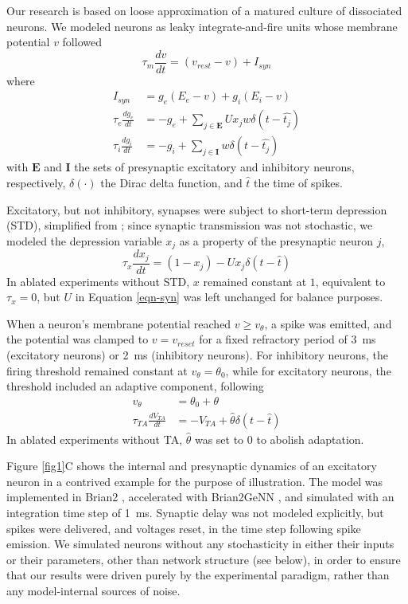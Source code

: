 \documentclass[pdflatex,iicol,sn-basic]{sn-jnl}
\theoremstyle{thmstyleone}%
\theoremstyle{thmstyletwo}%
\theoremstyle{thmstylethree}%
\begin{document}
Our research is based on loose approximation of a matured culture of dissociated neurons. We modeled neurons as leaky integrate-and-fire units whose membrane potential $v$ followed
\begin{equation}
    \tau_m \frac{dv}{dt} = (v_{rest}-v) + I_{syn}
\end{equation}
where
\begin{align}
    I_{syn} &= g_e(E_e-v) + g_i(E_i-v) \nonumber \\
    \tau_e \frac{dg_e}{dt} &= -g_e + \sum_{j \in \boldsymbol E} U x_j w \delta(t - \hat{t_j}) \nonumber \\
    \tau_i \frac{dg_i}{dt} &= -g_i + \sum_{j \in \boldsymbol I} w \delta(t - \hat{t_j}) \label{eqn-syn}
\end{align}
with $\boldsymbol E$ and $\boldsymbol I$ the sets of presynaptic excitatory and inhibitory neurons, respectively, $\delta(\cdot)$ the Dirac delta function, and $\hat{t}$ the time of spikes.

Excitatory, but not inhibitory, synapses were subject to short-term depression (STD), simplified from \cite{Tsodyks1997-qt}; since synaptic transmission was not stochastic, we modeled the depression variable $x_j$ as a property of the presynaptic neuron $j$,
\begin{equation}
    \tau_x \frac{dx_j}{dt} = (1-x_j) - U x_j \delta(t - \hat{t})
\end{equation}
In ablated experiments without STD, $x$ remained constant at $1$, equivalent to $\tau_x = 0$, but $U$ in Equation \ref{eqn-syn} was left unchanged for balance purposes.

When a neuron's membrane potential reached $v \geq v_\theta$, a spike was emitted, and the potential was clamped to $v = v_{reset}$ for a fixed refractory period of 3~ms (excitatory neurons) or 2~ms (inhibitory neurons). For inhibitory neurons, the firing threshold remained constant at $v_\theta = \theta_0$, while for excitatory neurons, the threshold included an adaptive component, following
\begin{align}
    v_\theta &= \theta_0 + \theta \nonumber \\
    \tau_{TA} \frac{dV_{TA}}{dt} &= -V_{TA} + \hat{\theta} \delta(t - \hat{t})
\end{align}
In ablated experiments without TA, $\hat{\theta}$ was set to $0$ to abolish adaptation.

Figure \ref{fig1}C shows the internal and presynaptic dynamics of an excitatory neuron in a contrived example for the purpose of illustration. The model was implemented in Brian2 \citep{Stimberg2019-tc}, accelerated with Brian2GeNN \cite{Stimberg2020-go}, and simulated with an integration time step of 1~ms. Synaptic delay was not modeled explicitly, but spikes were delivered, and voltages reset, in the time step following spike emission. We simulated neurons without any stochasticity in either their inputs or their parameters, other than network structure (see below), in order to ensure that our results were driven purely by the experimental paradigm, rather than any model-internal sources of noise.
\end{document}

